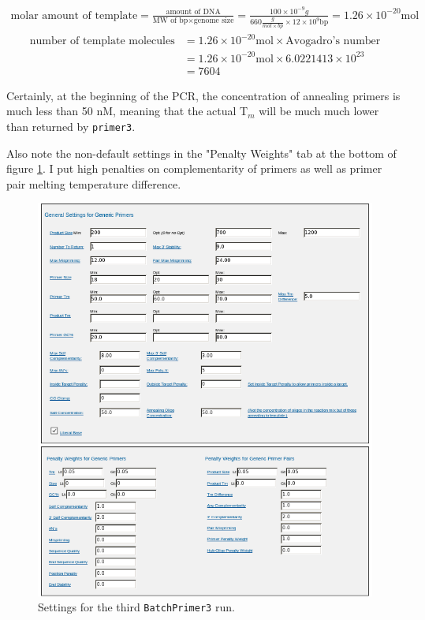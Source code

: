 \documentclass{article}\usepackage[]{graphicx}\usepackage[]{color}
\begin{document}
\begin{align}
\text{molar amount of template} = \frac{\text{amount of DNA}}{\text{MW of bp} \times \text{genome size}} \nonumber
= \frac{100 \times 10^{-9}g}{660 \frac{g}{mol \times bp} \times 12 \times 10^{9} \text{bp}} \nonumber
= 1.26 \times 10^{-20} \text{mol} 
\end{align}
\begin{align}
\text{number of template molecules} &= 1.26 \times 10^{-20} \text{mol} \times \text{Avogadro's number} \nonumber \\
&= 1.26 \times 10^{-20} \text{mol} \times 6.0221413 \times 10^{23} \nonumber \\
&= 7604 \nonumber
\end{align}

Certainly, at the beginning of the PCR, the concentration of annealing primers is much less than 50 nM, meaning that the actual T$_{m}$ will be much much lower than returned by \texttt{primer3}. 

Also note the non-default settings in the "Penalty Weights" tab at the bottom of figure \ref{BatchPrimer3_settings}. I put high penalties on complementarity of primers as well as primer pair melting temperature difference.

\begin{figure}[htb!]
\centering
\includegraphics[width=\textwidth]{./figure/BatchPrimer3_settings}
\caption{Settings for the third \texttt{BatchPrimer3} run. }
\label{BatchPrimer3_settings}
\end{figure}
\end{document}
